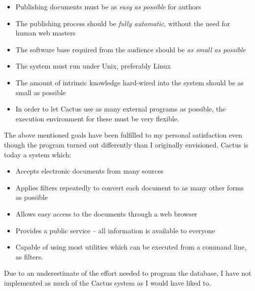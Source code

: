 \begin{itemize}
\item Publishing documents must be as \textit{easy as
    possible} for authors

\item The publishing process should be \textit{fully
    automatic}, without the need for human web masters

\item The software base required from the audience should be
  \textit{as small as possible}

\item The system must run under Unix, preferably Linux

\item The amount of intrinsic knowledge hard-wired into the
  system should be as small as possible

\item In order to let Cactus use as many external programs as
  possible, the execution environment for these must be very
  flexible.

\end{itemize}

The above mentioned goals have been fulfilled to my
personal satisfaction even though the program turned out
differently than I originally envisioned. Cactus is today a
system which:

\begin{itemize}

\item Accepts electronic documents from many sources

\item Applies filters repeatedly to convert each document to
  as many other forms as possible

\item Allows easy access to the documents through a web
  browser

\item Provides a public service -- all information is
  available to everyone


\item Capable of using most utilities which can be executed from a
  command line, as filters.
\end{itemize}

Due to an underestimate of the effort needed to program the
database, I have not implemented as much of
the Cactus system as I would have liked to.

